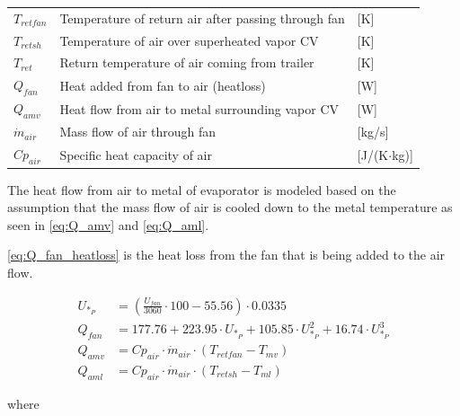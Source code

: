 \begin{center}
	\begin{tabular}{l p{10cm} l}
		$T_{retfan}$    & Temperature of return air after passing through fan & [\si{K}]                          \\
		$T_{retsh}$     & Temperature of air over superheated vapor CV        & [\si{K}]                          \\
		$T_{ret}$       & Return temperature of air coming from trailer       & [\si{K}]                          \\
		$Q_{fan}$       & Heat added from fan to air (heatloss)               & [\si{W}]                          \\
		$Q_{amv}$       & Heat flow from air to metal surrounding vapor CV    & [\si{W}]                          \\
		$\dot{m}_{air}$ & Mass flow of air through fan                        & [\si{kg}/\si{s}]                  \\
		$Cp_{air}$      & Specific heat capacity of air                       & [\si{J}/(\si{K}$ \cdot $\si{kg})]
	\end{tabular}
\end{center}

\medskip
The heat flow from air to metal of evaporator is modeled based on the assumption that the mass flow of air is cooled down to the metal temperature as seen in \cref{eq:Q_amv} and \cref{eq:Q_aml}.

\cref{eq:Q_fan_heatloss} is the heat loss from the fan that is being added to the air flow.

\begin{align}
	U_{*_P} & = \left( \frac{U_{fan}}{3060}\cdot 100 - 55.56 \right) \cdot 0.0335 \\
	Q_{fan} & = 177.76 + 223.95 \cdot U_{*_P} + 105.85 \cdot U_{*_P}^2 + 16.74 \cdot U_{*_P}^3
	\label{eq:Q_fan_heatloss}  \\
	Q_{amv} 		& = Cp_{air} \cdot \dot{m}_{air} \cdot (T_{retfan} - T_{mv}) 	\label{eq:Q_amv} \\
	Q_{aml} 		& = Cp_{air} \cdot \dot{m}_{air} \cdot (T_{retsh} - T_{ml}) 	\label{eq:Q_aml}
\end{align}

where

